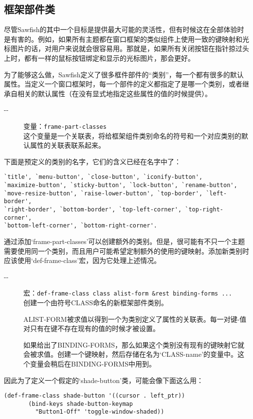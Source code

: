 \documentclass{book}
\begin{document}
\begin{CJK*}{UTF8}{gbsn}
\section{框架部件类}
尽管Sawfish的其中一个目标是提供最大可能的灵活性，但有时候这在全部体验时是有害的。例如，如果所有主题都在窗口框架的类似组件上使用一致的键映射和光标图片的话，对用户来说就会很容易用。那就是，如果所有关闭按钮在指针掠过头上时，都有一样的鼠标按钮绑定和显示的光标图片，那会更好。

为了能够这么做，Sawfish定义了很多框件部件的``类别''，每一个都有很多的默认属性。当定义一个窗口框架时，每一个部件的定义都指定了是哪一个类别，或者继承自相关的默认属性（在没有显式地指定这些属性的值的时候提供）。
\begin{description}
\item[-{}-] 变量：\verb|frame-part-classes|\\
这个变量是一个关联表，将给框架组件类别命名的符号和一个对应类别的默认属性的关联表联系起来。
\end{description}

下面是预定义的类别的名字，它们的含义已经在名字中了：
\begin{verbatim}
`title', `menu-button', `close-button', `iconify-button',
`maximize-button', `sticky-button', `lock-button', `rename-button',
`move-resize-button', `raise-lower-button', `top-border', `left-border',
`right-border', `bottom-border', `top-left-corner', `top-right-corner',
`bottom-left-corner', `bottom-right-corner'.
\end{verbatim}
通过添加`frame-part-classes'可以创建额外的类别。但是，很可能有不只一个主题需要使用同一个类别，而且用户可能希望定制额外的使用的键映射。添加新类别时应该使用`def-frame-class'宏，因为它处理上述情况。
\begin{description}
\item[-{}-] 宏：\verb|def-frame-class class alist-form &rest binding-forms ...|\\
创建一个由符号CLASS命名的新框架部件类别。

ALIST-FORM被求值以得到一个为类别定义了属性的关联表。每一对键-值对只有在键不存在现有的值的时候才被设置。

如果给出了BINDING-FORMS，那么如果这个类别没有现有的键映射它就会被求值。创建一个键映射，然后存储在名为`CLASS-name'的变量中。这个变量会稍后在BINDING-FORMS中用到。
\end{description}

因此为了定义一个假定的`shade-button'类，可能会像下面这么用：
\begin{verbatim}
(def-frame-class shade-button '((cursor . left_ptr))
       (bind-keys shade-button-keymap
         "Button1-Off" 'toggle-window-shaded))
\end{verbatim}


\end{CJK*}
\end{document}
